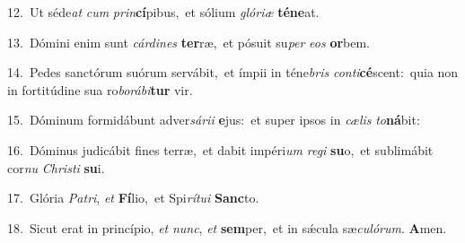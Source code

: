 {\numbfont\textcolor{\numbcolor}{12.}}~Ut séde\textit{at} \textit{cum} \textit{prin}\-\textbf{cí}pibus,~\star et sólium \textit{gló}\-\textit{ri}\textit{æ} \textbf{té}\-\textbf{ne}at.\par
{\numbfont\textcolor{\numbcolor}{13.}}~Dómini enim sunt \textit{cár}\-\textit{di}\textit{nes} \textbf{ter}\-ræ,~\star et pósuit su\textit{per} \textit{e}\-\textit{os} \textbf{or}\-bem.\par
{\numbfont\textcolor{\numbcolor}{14.}}~Pedes sanctórum suórum servábit,~\dagger et ímpii in téne\textit{bris} \textit{con}\-\textit{ti}\textbf{cé}scent:~\star quia non in fortitúdine sua ro\-\textit{bo}\-\textit{rá}\textit{bi}\textbf{tur} vir.\par
{\numbfont\textcolor{\numbcolor}{15.}}~Dóminum formidábunt adver\-\textit{sá}\-\textit{ri}\textit{i} \textbf{e}\-jus:~\star et super ipsos in \textit{cæ}\-\textit{lis} \textit{to}\-\textbf{ná}bit:\par
{\numbfont\textcolor{\numbcolor}{16.}}~Dóminus judicábit fines terræ,~\dagger et dabit impéri\textit{um} \textit{re}\-\textit{gi} \textbf{su}\-o,~\star et sublimábit cor\textit{nu} \textit{Chris}\-\textit{ti} \textbf{su}\-i.\par
{\numbfont\textcolor{\numbcolor}{17.}}~Glória \textit{Pa}\-\textit{tri}, \textit{et} \textbf{Fí}\-lio,~\star et Spi\-\textit{rí}\-\textit{tu}\textit{i} \textbf{Sanc}\-to.\par
{\numbfont\textcolor{\numbcolor}{18.}}~Sicut erat in princípio, \textit{et} \textit{nunc}\-, \textit{et} \textbf{sem}\-per,~\star et in sǽcula sæ\-\textit{cu}\-\textit{ló}\textit{rum}. \textbf{A}\-men.\par
